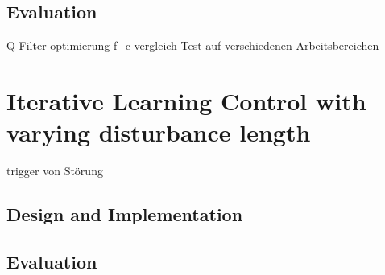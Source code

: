 \subsection{Evaluation}
Q-Filter optimierung f_c vergleich
Test auf verschiedenen Arbeitsbereichen


\section{Iterative Learning Control with varying disturbance length}
trigger von Störung
\subsection{Design and Implementation}
\subsection{Evaluation}
%
%
%
